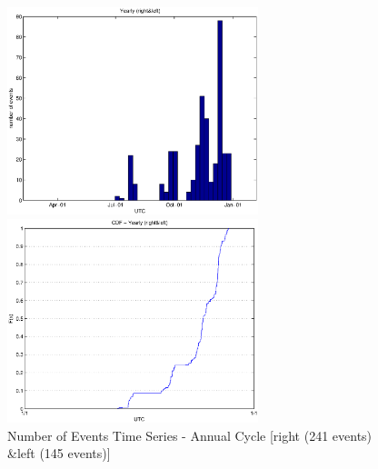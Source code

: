 \documentclass[a4paper,11pt]{article}
\begin{document}
\begin{figure}[htbp]
\begin{minipage}{0.55\hsize}
\centering
\includegraphics[width=7.3cm, clip]{histTimeYearly.eps}
\end{minipage}
\begin{minipage}{0.55\hsize}
 \centering
\includegraphics[width=7.3cm, clip]{CDFTimeYearly.eps}
\end{minipage}
\caption{Number of Events Time Series - Annual Cycle [right (241 events) \&left (145 events)]}
\end{figure}
\end{document}
